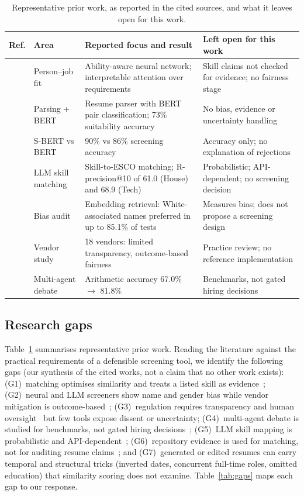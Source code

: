 \documentclass[conference]{IEEEtran}
\begin{document}
\begin{table}[t]
\caption{Representative prior work, as reported in the cited sources, and what it leaves open for this work.}
\label{tab:related}
\centering
\footnotesize
\renewcommand{\arraystretch}{1.15}
\begin{tabular}{@{}llp{5.2cm}p{5.4cm}@{}}
\toprule
Ref. & Area & Reported focus and result & Left open for this work \\
\midrule
\cite{qin_pjf}  & Person--job fit & Ability-aware neural network; interpretable attention over requirements & Skill claims not checked for evidence; no fairness stage \\
\cite{bhatia}   & Parsing + BERT  & Resume parser with BERT pair classification; 73\% suitability accuracy & No bias, evidence or uncertainty handling \\
\cite{deshmukh} & S-BERT vs BERT  & 90\% vs 86\% screening accuracy & Accuracy only; no explanation of rejections \\
\cite{clavie}   & LLM skill matching & Skill-to-ESCO matching; R-precision@10 of 61.0 (House) and 68.9 (Tech) & Probabilistic; API-dependent; no screening decision \\
\cite{wilson}   & Bias audit & Embedding retrieval: White-associated names preferred in up to 85.1\% of tests & Measures bias; does not propose a screening design \\
\cite{raghavan} & Vendor study & 18 vendors: limited transparency, outcome-based fairness & Practice review; no reference implementation \\
\cite{du}       & Multi-agent debate & Arithmetic accuracy 67.0\% $\rightarrow$ 81.8\% & Benchmarks, not gated hiring decisions \\
\bottomrule
\end{tabular}
\end{table}

\subsection{Research gaps}
Table~\ref{tab:related} summarises representative prior work. Reading the literature against the practical requirements of a defensible screening tool, we identify the following gaps (our synthesis of the cited works, not a claim that no other work exists): (G1)~matching optimises similarity and treats a listed skill as evidence~\cite{qin_survey,ruijt,qin_pjf,bhatia,deshmukh}; (G2)~neural and LLM screeners show name and gender bias while vendor mitigation is outcome-based~\cite{wilson,armstrong,raghavan}; (G3)~regulation requires transparency and human oversight~\cite{euai} but few tools expose dissent or uncertainty; (G4)~multi-agent debate is studied for benchmarks, not gated hiring decisions~\cite{du,chateval}; (G5)~LLM skill mapping is probabilistic and API-dependent~\cite{clavie}; (G6)~repository evidence is used for matching, not for auditing resume claims~\cite{hauff}; and (G7)~generated or edited resumes can carry temporal and structural tricks (inverted dates, concurrent full-time roles, omitted education) that similarity scoring does not examine. Table~\ref{tab:gaps} maps each gap to our response.
\end{document}
